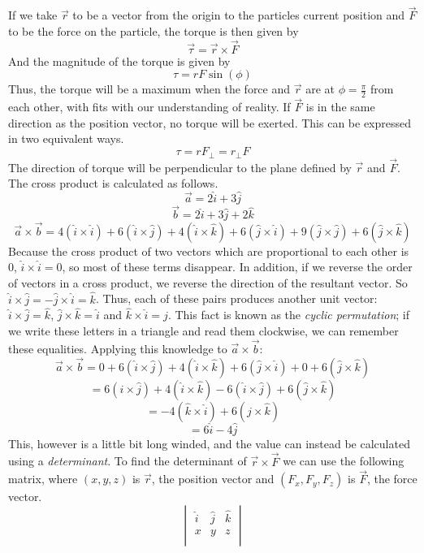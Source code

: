 \documentclass[12pt]{report}
\begin{document}
\begin{flushleft}
\bigskip
If we take \(\vec{r}\) to be a vector from the origin to the particles current
position and \(\vec{F}\) to be the force on the particle, the torque is then 
given by
\[\vec{\tau} = \vec{r}\times\vec{F}\]
And the magnitude of the torque is given by
\[\tau = rF\sin(\phi)\]
Thus, the torque will be a maximum when the force and \(\vec{r}\) are at 
\(\phi = \frac{\pi}{2}\) from each other, with fits with our understanding
of reality. If \(\vec{F}\) is in the same direction as the position vector,
no torque will be exerted. This can be expressed in two equivalent ways.
\[\tau = rF_\perp = r_\perp F\]
The direction of torque will be perpendicular to the plane defined by 
\(\vec{r}\) and \(\vec{F}\). The cross product is calculated as follows.
\[\vec{a} = 2\hat{i} + 3\hat{j}\]
\[\vec{b} = 2\hat{i} + 3\hat{j} + 2\hat{k}\]
\[\vec{a} \times \vec{b} = 4(\hat{i} \times \hat{i}) + 6(\hat{i} \times 
\hat{j}) + 4(\hat{i} \times \hat{k}) + 6(\hat{j} \times \hat{i}) + 
9(\hat{j} \times \hat{j}) + 6(\hat{j} \times \hat{k})\]
Because the cross product of two vectors which are proportional to each other
is \(0\), \(\hat{i}\times\hat{i} = 0\), so most of these terms disappear. In
addition, if we reverse the order of vectors in a cross product, we reverse the
direction of the resultant vector. So \(\hat{i}\times\hat{j} = 
-\hat{j}\times\hat{i} = \hat{k}\). Thus, each of these pairs produces another
unit vector: \(\hat{i}\times\hat{j} = \hat{k}\), \(\hat{j}\times\hat{k} = 
\hat{i}\) and \(\hat{k}\times\hat{i} = \hat{j}\). This fact is known as the 
\textit{cyclic permutation}; if we write these letters in a triangle and read
them clockwise, we can remember these equalities. Applying this knowledge to 
\(\vec{a} \times \vec{b}\):
\[\vec{a} \times \vec{b} = 0 + 6(\hat{i} \times \hat{j}) + 4(\hat{i} \times 
\hat{k}) + 6(\hat{j} \times \hat{i}) + 0 + 6(\hat{j} \times \hat{k})\]
\[= 6(\hat{i} \times \hat{j}) + 4(\hat{i} \times 
\hat{k}) - 6(\hat{i} \times \hat{j}) + 6(\hat{j} \times \hat{k})\]
\[= -4(\hat{k} \times \hat{i}) + 6(\hat{j} \times \hat{k})\]
\[= 6\hat{i} - 4\hat{j}\]
This, however is a little bit long winded, and the value can instead be 
calculated using a \textit{determinant}. To find the determinant of 
\(\vec{r}\times\vec{F}\) we can use the following matrix, where \((x, y, z)\)
is \(\vec{r}\), the position vector and \((F_x, F_y, F_z)\) is \(\vec{F}\), the
force vector.
\[
    \begin{vmatrix}
        \hat{i} & \hat{j} & \hat{k} \\
        x & y & z \\

\end{vmatrix}\]
\end{flushleft}
\end{document}
